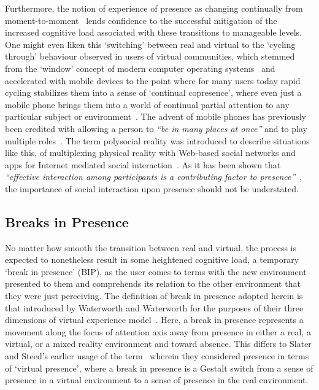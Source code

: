 Furthermore, the notion of experience of presence as changing continually from moment-to-moment~\cite{Heeter2003, Ijsselsteijn1998} lends confidence to the successful mitigation of the increased cognitive load associated with these transitions to manageable levels. One might even liken this `switching' between real and virtual to the `cycling through' behaviour observed in users of virtual communities, which stemmed from the `window' concept of modern computer operating systems~\cite{Turkle2004} and accelerated with mobile devices to the point where for many users today rapid cycling stabilizes them into a sense of `continual copresence', where even just a mobile phone brings them into a world of continual partial attention to any particular subject or environment~\cite{Turkle2011}. The advent of mobile phones has previously been credited with allowing a person to \textit{``be in many places at once''} and to play multiple roles~\cite{Terashima2001}. The term polysocial reality was introduced to describe situations like this, of multiplexing physical reality with Web-based social networks and apps for Internet mediated social interaction~\cite{Applin2012}. As it has been shown that \textit{``effective interaction among participants is a contributing factor to presence''}~\cite{Terashima2001}, the importance of social interaction upon presence should not be understated.



\subsection{Breaks in Presence}

\label{background-breaks-in-presence}

No matter how smooth the transition between real and virtual, the process is expected to nonetheless result in some heightened cognitive load, a temporary `break in presence' (BIP), as the user comes to terms with the new environment presented to them and comprehends its relation to the other environment that they were just perceiving. The definition of break in presence adopted herein is that introduced by Waterworth and Waterworth for the purposes of their three dimensions of virtual experience model~\cite{Waterworth2001}. Here, a break in presence represents a movement along the focus of attention axis away from presence in either a real, a virtual, or a mixed reality environment and toward absence. This differs to Slater and Steed's earlier usage of the term~\cite{Slater2000} wherein they considered presence in terms of `virtual presence', where a break in presence is a Gestalt switch from a sense of presence in a virtual environment to a sense of presence in the real environment.


